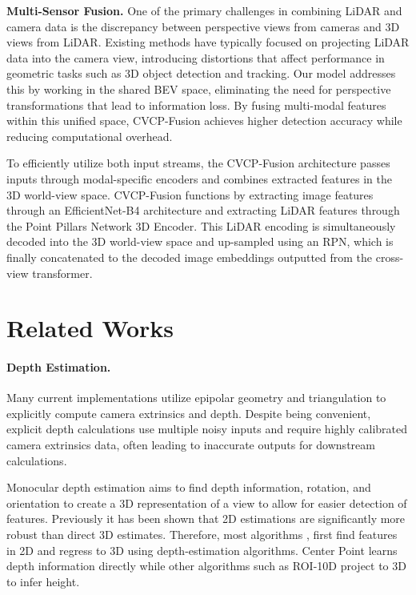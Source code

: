 \documentclass[a4paper,12pt]{article}
\begin{document}
\begin{multicols}{2}
\textbf{Multi-Sensor Fusion. }One of the primary challenges in combining LiDAR and camera data is the discrepancy between perspective views from cameras and 3D views from LiDAR. Existing methods have typically focused on projecting LiDAR data into the camera view, introducing distortions that affect performance in geometric tasks such as 3D object detection and tracking. Our model addresses this by working in the shared BEV space, eliminating the need for perspective transformations that lead to information loss. By fusing multi-modal features within this unified space, CVCP-Fusion achieves higher detection accuracy while reducing computational overhead.

To efficiently utilize both input streams, the CVCP-Fusion architecture passes inputs through modal-specific encoders and combines extracted features in the 3D world-view space. CVCP-Fusion functions by extracting image features through an EfficientNet-B4 architecture and extracting LiDAR features through the Point Pillars Network\cite{PointPillars} 3D Encoder. This LiDAR encoding is simultaneously decoded into the 3D world-view  space and up-sampled using an RPN, which is finally concatenated to the decoded image embeddings outputted from the cross-view transformer.


\section{Related Works}

\paragraph{Depth Estimation. }
Many current implementations \cite{ BuildingRomeInADay, LonguetHiggins1981ACA, StructureFromMotion, PhotoTourism} utilize epipolar geometry and triangulation to explicitly compute camera extrinsics and depth. Despite being convenient, explicit depth calculations use multiple noisy inputs and require highly calibrated camera extrinsics data, often leading to inaccurate outputs for downstream calculations.

Monocular depth estimation aims to find depth information, rotation, and orientation to create a 3D representation of a view to allow for easier detection of features. Previously it has been shown that 2D estimations are significantly more robust than direct 3D estimates. Therefore, most algorithms \cite{Center-Point}, \cite{ROI-10D} first find features in 2D and regress to 3D using depth-estimation algorithms.  Center Point \cite{Center-Point} learns depth information directly while other algorithms such as ROI-10D \cite{ROI-10D} project to 3D to infer height. 


\end{multicols}
\end{document}
